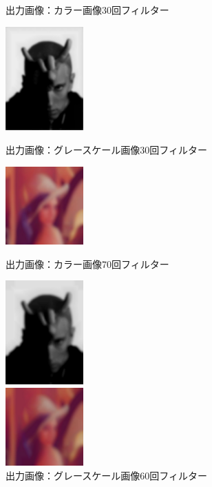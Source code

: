 \documentclass[10pt,a4paper]{jsarticle}
\begin{document}
\begin{figure}[htbp]
\begin{minipage}{0.25\hsize}
    \caption{出力画像：カラー画像30回フィルター}
    \label{fig:sutehage}
  \end{minipage}
  \begin{minipage}{0.25\hsize}
    \begin{center}
      \includegraphics[width=30mm]{FilteredImageGray30.jpg}
    \end{center}
    \caption{出力画像：グレースケール画像30回フィルター}
    \label{fig:sutehage}
  \end{minipage}

  \begin{minipage}{0.25\hsize}
    \begin{center}
      \includegraphics[width=30mm]{FilteredImageColor70.jpg}
    \end{center}
    \caption{出力画像：カラー画像70回フィルター}
    \label{fig:sutehage}
  \end{minipage}
  \begin{minipage}{0.25\hsize}
    \begin{center}
      \includegraphics[width=30mm]{FilteredImageGray60.jpg}
    \end{center}
    \caption{出力画像：グレースケール画像60回フィルター}
    \label{fig:sutehage}
  \end{minipage}
  \begin{minipage}{0.25\hsize}
    \begin{center}
      \includegraphics[width=30mm]{FilteredImageColor100.jpg}
    \end{center}


\end{minipage}
\end{figure}
\end{document}
